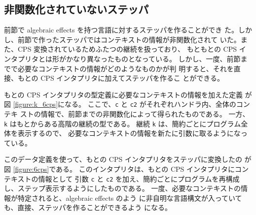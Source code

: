 \subsection{非関数化されていないステッパ}

前節で algebraic effects を持つ言語に対するステッパを作ることができ
た。しかし、前節で作ったステッパではコンテキストの情報が非関数化されて
いた。また、CPS 変換されているためふたつの継続を扱っており、
もともとの CPS インタプリタとは形がかなり異なったものとなっている。
しかし、一度、前節までで必要なコンテキストの情報がどのようなものかが判
明すると、それを直接、もとの CPS インタプリタに加えてステッパを作るこ
とができる。

もとの CPS インタプリタの型定義に必要なコンテキストの情報を加えた定義
が図 \ref{figure:k_6cps}になる。
ここで、\texttt{c} と \texttt{c2} がそれぞれハンドラ内、全体のコンテキ
ストの情報で、前節までの非関数化によって得られたものである。
一方、\texttt{k} はもとからある高階の継続の型である。
継続 \texttt{k} は、簡約ごとにプログラム全体を表示するので、
必要なコンテキストの情報を新たに引数に取るようになっている。

このデータ定義を使って、もとの CPS インタプリタをステッパに変換したの
が図 \ref{figure:6cps}である。
このインタプリタは、もとの CPS インタプリタにコンテキストの情報として
引数 \texttt{c} と \texttt{c2} を加え、簡約ごとにプログラムを再構成
し、ステップ表示するようにしたものである。
一度、必要なコンテキストの情報が特定されると、algebraic effects のよう
に非自明な言語構文が入っていても、直接、ステッパを作ることができるよう
になる。

